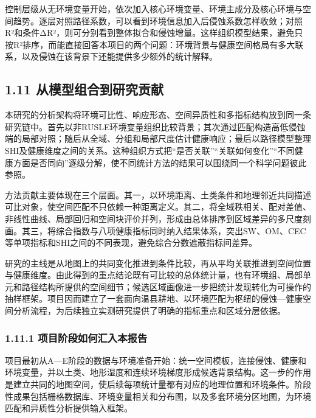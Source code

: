 \documentclass[
  11pt,
  a4paper,
]{ctexart}
\begin{document}
控制层级从无环境变量开始，依次加入核心环境变量、环境主成分及核心环境与空间趋势。逐层对照路径系数，可以看到环境信息加入后侵蚀系数怎样收敛；对照R²和条件ΔR²，则可分别看到整体拟合和侵蚀增量。这样组织模型结果，避免只按R²排序，而能直接回答本项目的两个问题：环境背景与健康空间格局有多大联系，以及侵蚀在该背景下还能提供多少额外的统计解释。

\hypertarget{ux4eceux6a21ux578bux7ec4ux5408ux5230ux7814ux7a76ux8d21ux732e}{%
\subsection{1.11
从模型组合到研究贡献}\label{ux4eceux6a21ux578bux7ec4ux5408ux5230ux7814ux7a76ux8d21ux732e}}

本研究的分析架构将环境可比性、响应形态、空间异质性和多指标结构放到同一条研究链中。首先以非RUSLE环境变量组织比较背景；其次通过匹配构造高低侵蚀端的局部对照；随后从全域、分组和局部尺度估计健康响应；最后以路径模型整理SHI及健康维度之间的关系。这种组织方式把``是否关联''``关联如何变化''``不同健康方面是否同向''逐级分解，使不同统计方法的结果可以围绕同一个科学问题彼此参照。

方法贡献主要体现在三个层面。其一，以环境距离、土类条件和地理邻近共同描述可比对象，使空间匹配不只依赖一种距离定义。其二，将全域秩相关、配对差值、非线性曲线、局部回归和空间块评价并列，形成由总体排序到区域差异的多尺度刻画。其三，将综合指数与八项健康指标同时纳入结果体系，突出SW、OM、CEC等单项指标和SHI之间的不同表现，避免综合分数遮蔽指标间差异。

研究的主线是从地图上的共同变化推进到条件比较，再从平均关联推进到空间位置与健康维度。由此得到的重点结论既有可比较的总体统计量，也有环境组、局部单元和路径结构所提供的空间细节；候选区域画像进一步把统计发现转化为可操作的抽样框架。项目因而建立了一套面向温县耕地、以环境匹配为枢纽的侵蚀---健康空间分析流程，为后续独立实测研究提供了明确的指标重点和区域分层依据。

\hypertarget{ux9879ux76eeux9636ux6bb5ux5982ux4f55ux6c47ux5165ux672cux62a5ux544a}{%
\subsubsection{1.11.1
项目阶段如何汇入本报告}\label{ux9879ux76eeux9636ux6bb5ux5982ux4f55ux6c47ux5165ux672cux62a5ux544a}}

项目最初从A---E阶段的数据与环境准备开始：统一空间模板，连接侵蚀、健康和环境变量，并以土类、地形湿度和连续环境梯度形成候选背景结构。这一步的作用是建立共同的地图空间，使后续每项统计量都有对应的地理位置和环境条件。阶段性成果包括栅格数据库、环境变量相关和分布图，以及多套环境分区地图，为环境匹配和异质性分析提供输入框架。
\end{document}

